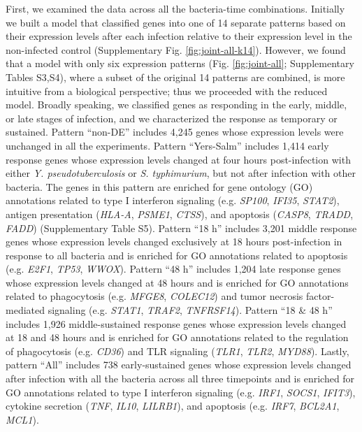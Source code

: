 First, we examined the data across all the bacteria-time combinations.
Initially we built a model that classified genes into one of 14 separate
patterns based on their expression levels after each infection relative
to their expression level in the non-infected control (Supplementary
Fig. \ref{fig:joint-all-k14}). However, we found that a model with only six expression
patterns (Fig. \ref{fig:joint-all}; Supplementary Tables S3,S4), where a subset of the
original 14 patterns are combined, is more intuitive from a biological
perspective; thus we proceeded with the reduced model. Broadly speaking,
we classified genes as responding in the early, middle, or late stages
of infection, and we characterized the response as temporary or
sustained. Pattern ``non-DE'' includes 4,245 genes whose expression
levels were unchanged in all the experiments. Pattern ``Yers-Salm''
includes 1,414 early response genes whose expression levels changed at
four hours post-infection with either \emph{Y. pseudotuberculosis} or
\emph{S. typhimurium}, but not after infection with other bacteria. The
genes in this pattern are enriched for gene ontology (GO) annotations
related to type I interferon signaling (e.g. \emph{SP100}, \emph{IFI35},
\emph{STAT2}), antigen presentation (\emph{HLA-A}, \emph{PSME1},
\emph{CTSS}), and apoptosis (\emph{CASP8}, \emph{TRADD}, \emph{FADD})
(Supplementary Table S5). Pattern ``18 h'' includes 3,201 middle
response genes whose expression levels changed exclusively at 18 hours
post-infection in response to all bacteria and is enriched for GO
annotations related to apoptosis (e.g. \emph{E2F1}, \emph{TP53},
\emph{WWOX}). Pattern ``48 h'' includes 1,204 late response genes whose
expression levels changed at 48 hours and is enriched for GO annotations
related to phagocytosis (e.g. \emph{MFGE8}, \emph{COLEC12}) and tumor
necrosis factor-mediated signaling (e.g. \emph{STAT1}, \emph{TRAF2},
\emph{TNFRSF14}). Pattern ``18 \& 48 h'' includes 1,926 middle-sustained
response genes whose expression levels changed at 18 and 48 hours and is
enriched for GO annotations related to the regulation of phagocytosis
(e.g. \emph{CD36}) and TLR signaling (\emph{TLR1}, \emph{TLR2},
\emph{MYD88}). Lastly, pattern ``All'' includes 738 early-sustained
genes whose expression levels changed after infection with all the
bacteria across all three timepoints and is enriched for GO annotations
related to type I interferon signaling (e.g. \emph{IRF1}, \emph{SOCS1},
\emph{IFIT3}), cytokine secretion (\emph{TNF}, \emph{IL10},
\emph{LILRB1}), and apoptosis (e.g. \emph{IRF7}, \emph{BCL2A1},
\emph{MCL1}).

